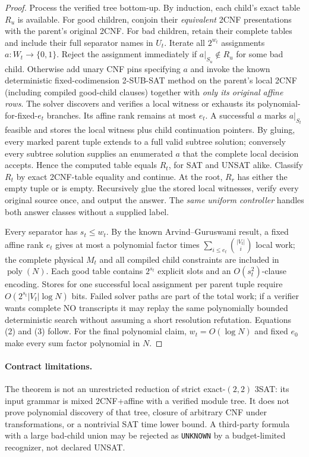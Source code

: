 \documentclass[10pt]{article}
\begin{document}
\begin{proof}
Process the verified tree bottom-up. By induction, each child's exact table $R_u$ is available. For good children, conjoin their \emph{equivalent} 2CNF presentations with the parent's original 2CNF. For bad children, retain their complete tables and include their full separator names in $U_t$. Iterate all $2^{w_t}$ assignments $a:W_t\to\{0,1\}$. Reject the assignment immediately if $a|_{S_u}\notin R_u$ for some bad child. Otherwise add unary CNF pins specifying $a$ and invoke the known deterministic fixed-codimension 2-SUB-SAT method on the parent's local 2CNF (including compiled good-child clauses) together with \emph{only its original affine rows}. The solver discovers and verifies a local witness or exhausts its polynomial-for-fixed-$e_t$ branches. Its affine rank remains at most $e_t$. A successful $a$ marks $a|_{S_t}$ feasible and stores the local witness plus child continuation pointers. By gluing, every marked parent tuple extends to a full valid subtree solution; conversely every subtree solution supplies an enumerated $a$ that the complete local decision accepts. Hence the computed table equals $R_t$, for SAT and UNSAT alike. Classify $R_t$ by exact 2CNF-table equality and continue. At the root, $R_r$ has either the empty tuple or is empty. Recursively glue the stored local witnesses, verify every original source once, and output the answer. The \emph{same uniform controller} handles both answer classes without a supplied label.

Every separator has $s_t\le w_t$. By the known Arvind--Guruswami result, a fixed affine rank $e_t$ gives at most a polynomial factor times $\sum_{i\le e_t}\binom{|V_t|}{i}$ local work; the complete physical $M_t$ and all compiled child constraints are included in $\operatorname{poly}(N)$. Each good table contains $2^{s_t}$ explicit slots and an $O(s_t^2)$-clause encoding. Stores for one successful local assignment per parent tuple require $O(2^{s_t}|V_t|\log N)$ bits. Failed solver paths are part of the total work; if a verifier wants complete NO transcripts it may replay the same polynomially bounded deterministic search without assuming a short resolution refutation. Equations (2) and (3) follow. For the final polynomial claim, $w_t=O(\log N)$ and fixed $e_0$ make every sum factor polynomial in $N$.
\end{proof}
\paragraph{Contract limitations.} The theorem is not an unrestricted reduction of strict exact-$(2,2)$ 3SAT: its input grammar is mixed 2CNF+affine with a verified module tree. It does not prove polynomial discovery of that tree, closure of arbitrary CNF under transformations, or a nontrivial SAT time lower bound. A third-party formula with a large bad-child union may be rejected as \texttt{UNKNOWN} by a budget-limited recognizer, not declared UNSAT.
\end{document}
